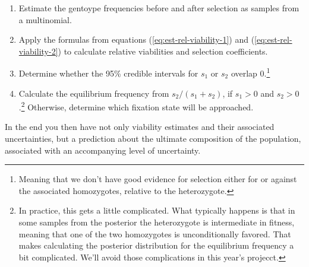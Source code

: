\documentclass[12pt]{article}
\begin{document}
\begin{enumerate}

\item Estimate the gentoype frequencies before and after selection as
  samples from a multinomial.

\item Apply the formulas from equations (\ref{eq:est-rel-viability-1})
  and (\ref{eq:est-rel-viability-2}) to calculate relative viabilities
  and selection coefficients.

\item Determine whether the 95\% credible intervals for $s_1$ or $s_2$
  overlap 0.\footnote{Meaning that we don't have good evidence for
  selection either for or against the associated homozygotes, relative
  to the heterozygote.}

\item Calculate the equilibrium frequency from $s_2/(s_1+s_2)$, if
  $s_1 > 0$ and $s_2 > 0$.\footnote{In practice, this gets a little
    complicated. What typically happens is that in some samples from
    the posterior the heterozygote is intermediate in fitness, meaning
    that one of the two homozygotes is unconditionally favored. That
    makes calculating the posterior distribution for the equilibrium
    frequency a bit complicated. We'll avoid those complications in
    this year's projecct.} Otherwise, determine which fixation state
  will be approached.

\end{enumerate}

\noindent In the end you then have not only viability estimates and
their associated uncertainties, but a prediction about the ultimate
composition of the population, associated with an accompanying level
of uncertainty.




\ccLicense
\end{document}
